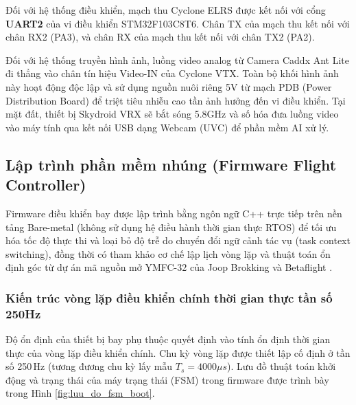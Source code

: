 Đối với hệ thống điều khiển, mạch thu Cyclone ELRS được kết nối với cổng \textbf{UART2} của vi điều khiển STM32F103C8T6. Chân TX của mạch thu kết nối với chân RX2 (PA3), và chân RX của mạch thu kết nối với chân TX2 (PA2).

Đối với hệ thống truyền hình ảnh, luồng video analog từ Camera Caddx Ant Lite đi thẳng vào chân tín hiệu Video-IN của Cyclone VTX. Toàn bộ khối hình ảnh này hoạt động độc lập và sử dụng nguồn nuôi riêng 5V từ mạch PDB (Power Distribution Board) để triệt tiêu nhiễu cao tần ảnh hưởng đến vi điều khiển. Tại mặt đất, thiết bị Skydroid VRX sẽ bắt sóng 5.8GHz và số hóa đưa luồng video vào máy tính qua kết nối USB dạng Webcam (UVC) để phần mềm AI xử lý.

\subsection{Lập trình phần mềm nhúng (Firmware Flight Controller)}

Firmware điều khiển bay được lập trình bằng ngôn ngữ C++ trực tiếp trên nền tảng Bare-metal (không sử dụng hệ điều hành thời gian thực RTOS) để tối ưu hóa tốc độ thực thi và loại bỏ độ trễ do chuyển đổi ngữ cảnh tác vụ (task context switching), đồng thời có tham khảo cơ chế lập lịch vòng lặp và thuật toán ổn định góc từ dự án mã nguồn mở YMFC-32 của Joop Brokking \cite{brokking_ymfc32} và Betaflight \cite{betaflight2024}.

\subsubsection{Kiến trúc vòng lặp điều khiển chính thời gian thực tần số 250Hz}

Độ ổn định của thiết bị bay phụ thuộc quyết định vào tính ổn định thời gian thực của vòng lặp điều khiển chính. Chu kỳ vòng lặp được thiết lập cố định ở tần số 250\,Hz (tương đương chu kỳ lấy mẫu $T_s = 4000\mu s$). Lưu đồ thuật toán khởi động và trạng thái của máy trạng thái (FSM) trong firmware được trình bày trong Hình \ref{fig:luu_do_fsm_boot}.

